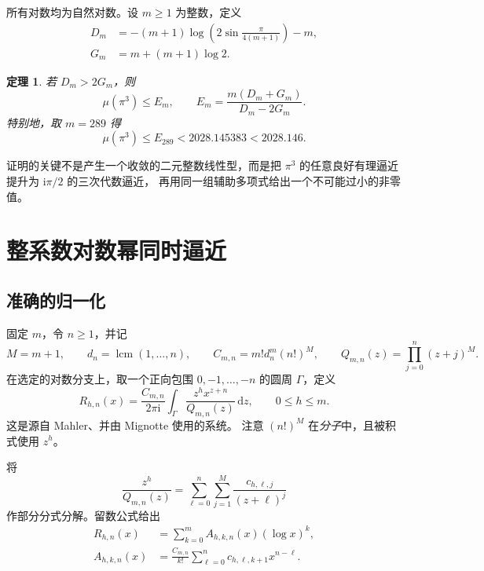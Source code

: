 \documentclass[UTF8,fontset=fandol,a4paper,11pt]{ctexart}
\newtheorem{theorem}{定理}[section]
\theoremstyle{remark}
\newcommand{\ii}{\mathrm i}
\newcommand{\lcm}{\operatorname{lcm}}
\newcommand{\dd}{\,\mathrm d}
\numberwithin{equation}{section}
\begin{document}
所有对数均为自然对数。设 $m\ge1$ 为整数，定义
\begin{align}
D_m&=-(m+1)\log\left(2\sin\frac{\pi}{4(m+1)}\right)-m,
  \label{eq:D}\\
G_m&=m+(m+1)\log2.\label{eq:G}
\end{align}
\begin{theorem}\label{thm:main}
若 $D_m>2G_m$，则
\begin{equation}\label{eq:Em}
 \mu(\pi^3)\le E_m,
 \qquad E_m=\frac{m(D_m+G_m)}{D_m-2G_m}.
\end{equation}
特别地，取 $m=289$ 得
\begin{equation}\label{eq:numerical-main}
\boxed{\ \mu(\pi^3)\le E_{289}<2028.145383<2028.146.\ }
\end{equation}
\end{theorem}

证明的关键不是产生一个收敛的二元整数线性型，而是把
$\pi^3$ 的任意良好有理逼近提升为 $\ii\pi/2$ 的三次代数逼近，
再用同一组辅助多项式给出一个不可能过小的非零值。

\section{整系数对数幂同时逼近}

\subsection{准确的归一化}

固定 $m$，令 $n\ge1$，并记
\[
M=m+1,\qquad d_n=\lcm(1,\ldots,n),\qquad
C_{m,n}=m!d_n^m(n!)^{M},\qquad
Q_{m,n}(z)=\prod_{j=0}^{n}(z+j)^M.
\]
在选定的对数分支上，取一个正向包围 $0,-1,\ldots,-n$ 的圆周 $\Gamma$，定义
\begin{equation}\label{eq:pade-integral}
R_{h,n}(x)=\frac{C_{m,n}}{2\pi\ii}
 \int_\Gamma\frac{z^h x^{z+n}}{Q_{m,n}(z)}\dd z,
 \qquad 0\le h\le m.
\end{equation}
这是源自 Mahler\cite{Mahler1953}、并由
Mignotte\cite[第122页，式(1)--(4)]{Mignotte1974} 使用的系统。
注意 $(n!)^M$ 在\emph{分子}中，且被积式使用 $z^h$。

将
\[
\frac{z^h}{Q_{m,n}(z)}
=\sum_{\ell=0}^{n}\sum_{j=1}^{M}
\frac{c_{h,\ell,j}}{(z+\ell)^j}
\]
作部分分式分解。留数公式给出
\begin{align}
R_{h,n}(x)&=\sum_{k=0}^{m}A_{h,k,n}(x)(\log x)^k,
 \label{eq:pade-system}\\
A_{h,k,n}(x)&=\frac{C_{m,n}}{k!}
\sum_{\ell=0}^{n}c_{h,\ell,k+1}x^{n-\ell}.
 \label{eq:coefficients}
\end{align}
\end{document}
